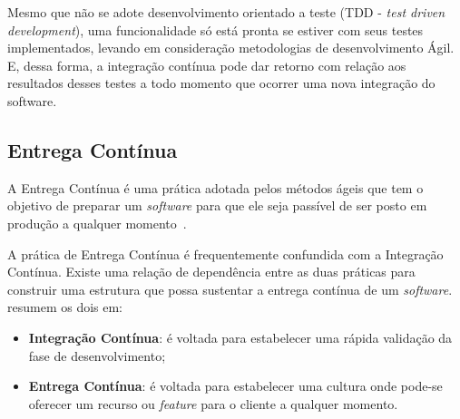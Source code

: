 Mesmo que não se adote desenvolvimento orientado a teste 
(TDD - \textit{test driven development}), uma funcionalidade só está 
pronta se estiver com seus testes implementados, levando em consideração 
metodologias de desenvolvimento Ágil. E, dessa forma, a integração 
contínua pode dar retorno com relação aos resultados desses testes a todo momento que ocorrer uma nova integração do software. %

\subsection{Entrega Contínua}

A Entrega Contínua é uma prática adotada pelos métodos ágeis que tem o objetivo
de preparar um \textit{software} para que ele seja passível de ser posto em produção a
qualquer momento~\cite{olausson:2016}. 

A prática de Entrega Contínua  é frequentemente confundida com a Integração
Contínua. Existe uma relação de dependência entre as duas práticas para
construir uma estrutura que possa sustentar a entrega contínua de um
\textit{software}.~ resumem os dois em:

\begin{itemize}
  \item \textbf{Integração Contínua}: é voltada para estabelecer uma rápida
    validação da fase de desenvolvimento;
  \item \textbf{Entrega Contínua}: é voltada para estabelecer uma cultura onde
    pode-se oferecer um recurso ou \textit{feature} para o cliente a qualquer
    momento.
\end{itemize}

